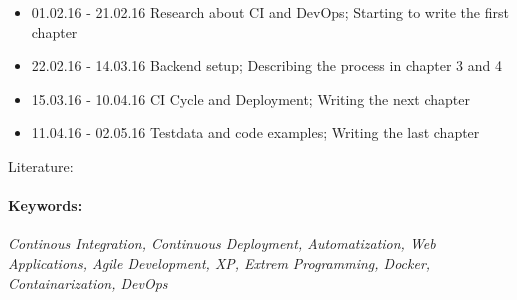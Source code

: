 \begin{itemize}
  \item 01.02.16 - 21.02.16 Research about CI and DevOps; Starting to write the first chapter
  \item 22.02.16 - 14.03.16 Backend setup; Describing the process in chapter 3 and 4
  \item 15.03.16 - 10.04.16 CI Cycle and Deployment; Writing the next chapter
  \item 11.04.16 - 02.05.16 Testdata and code examples; Writing the last chapter
\end{itemize}

Literature:

\cite{meyer2014continuous}
\cite{schaefer2013continuous}
\cite{humble2010continuous}
\cite{fowler2006continuous}
\cite{fowler2012continuous}
\cite{duvall2007continuous}
\cite{stolberg2009enabling}
\cite{humble2010continuous}
\cite{staahl2014modeling}
\cite{maurer2002extreme}
\cite{hansen2015continuous}
\cite{pasquali2015deploying}
\cite{turnbull2014docker}
\cite{raj2015learning}
\cite{astels2003test}
\cite{beck2003test}
\cite{maximilien2003assessing}
\cite{janzen2005test}

\paragraph{Keywords:}
\textit{Continous Integration, Continuous Deployment, Automatization, Web Applications, Agile Development, XP, Extrem Programming, Docker, Containarization, DevOps }
